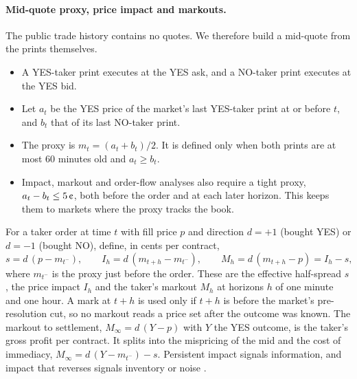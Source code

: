 \paragraph{Mid-quote proxy, price impact and markouts.} The public trade history contains no
quotes. We therefore build a mid-quote from the prints themselves.
\begin{itemize}
  \item A YES-taker print executes at the YES ask, and a NO-taker print executes at the YES bid.
  \item Let $a_t$ be the YES price of the market's last YES-taker print at or before $t$, and
  $b_t$ that of its last NO-taker print.
  \item The proxy is $m_t=(a_t+b_t)/2$. It is defined only when both prints are at most 60
  minutes old and $a_t\ge b_t$.
  \item Impact, markout and order-flow analyses also require a tight proxy,
  $a_t-b_t\le5\cents$, both before the order and at each later horizon. This keeps them to
  markets where the proxy tracks the book.
\end{itemize}
For a taker order at time $t$ with fill price $p$ and direction $d=+1$ (bought YES) or $d=-1$
(bought NO), define, in cents per contract,
\begin{equation}\label{eq:flow-markout}
  s=d\,(p-m_{t^-}),\qquad I_h=d\,(m_{t+h}-m_{t^-}),\qquad M_h=d\,(m_{t+h}-p)=I_h-s,
\end{equation}
where $m_{t^-}$ is the proxy just before the order. These are the effective half-spread $s$,
the price impact $I_h$ and the taker's markout $M_h$ at horizons $h$ of one minute and one hour.
A mark at $t+h$ is used only if $t+h$ is before the market's pre-resolution cut, so no markout
reads a price set after the outcome was known. The markout to settlement, $M_\infty=d\,(Y-p)$
with $Y$ the YES outcome, is the taker's gross profit per contract. It splits into the
mispricing of the mid and the cost of immediacy, $M_\infty=d\,(Y-m_{t^-})-s$. Persistent impact
signals information, and impact that reverses signals inventory or noise
\citep{glostenmilgrom1985,hasbrouck1991}.

